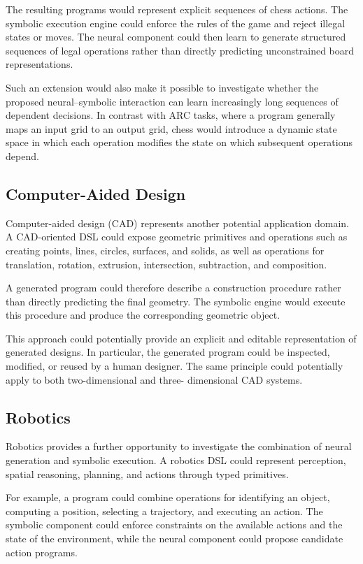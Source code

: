 \documentclass[final]{nesy2027}
\begin{document}
The resulting programs would represent explicit sequences of chess actions.
The symbolic execution engine could enforce the rules of the game and reject
illegal states or moves. The neural component could then learn to generate
structured sequences of legal operations rather than directly predicting
unconstrained board representations.

Such an extension would also make it possible to investigate whether the
proposed neural--symbolic interaction can learn increasingly long sequences
of dependent decisions. In contrast with ARC tasks, where a program generally
maps an input grid to an output grid, chess would introduce a dynamic state
space in which each operation modifies the state on which subsequent
operations depend.

\subsection{Computer-Aided Design}
\label{subsec:perspectives-cad}

Computer-aided design (CAD) represents another potential application domain.
A CAD-oriented DSL could expose geometric primitives and operations such as
creating points, lines, circles, surfaces, and solids, as well as operations
for translation, rotation, extrusion, intersection, subtraction, and
composition.

A generated program could therefore describe a construction procedure rather
than directly predicting the final geometry. The symbolic engine would
execute this procedure and produce the corresponding geometric object.

This approach could potentially provide an explicit and editable
representation of generated designs. In particular, the generated program
could be inspected, modified, or reused by a human designer. The same
principle could potentially apply to both two-dimensional and three-
dimensional CAD systems.

\subsection{Robotics}
\label{subsec:perspectives-robotics}

Robotics provides a further opportunity to investigate the combination of
neural generation and symbolic execution. A robotics DSL could represent
perception, spatial reasoning, planning, and actions through typed primitives.

For example, a program could combine operations for identifying an object,
computing a position, selecting a trajectory, and executing an action. The
symbolic component could enforce constraints on the available actions and
the state of the environment, while the neural component could propose
candidate action programs.
\end{document}
